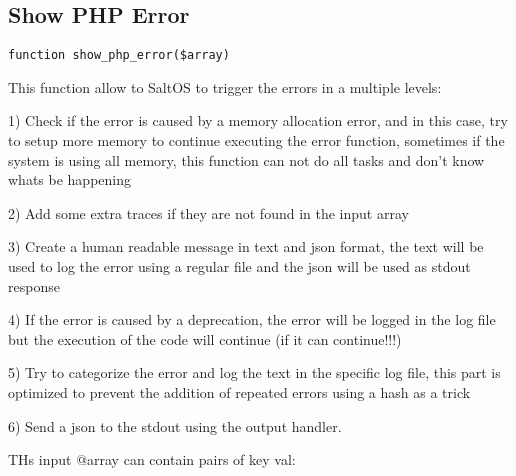 \documentclass[a4paper]{book}
\begin{document}
\hypertarget{toc104}{}
\subsection{Show PHP Error}

\begin{lstlisting}
function show_php_error($array)
\end{lstlisting}

This function allow to SaltOS to trigger the errors in a multiple levels:

1) Check if the error is caused by a memory allocation error, and in this case, try
to setup more memory to continue executing the error function, sometimes if the system
is using all memory, this function can not do all tasks and don't know whats be happening

2) Add some extra traces if they are not found in the input array

3) Create a human readable message in text and json format, the text will be used
to log the error using a regular file and the json will be used as stdout response

4) If the error is caused by a deprecation, the error will be logged in the log file
but the execution of the code will continue (if it can continue!!!)

5) Try to categorize the error and log the text in the specific log file, this part
is optimized to prevent the addition of repeated errors using a hash as a trick

6) Send a json to the stdout using the output handler.

THs input @array can contain pairs of key val:
\end{document}

